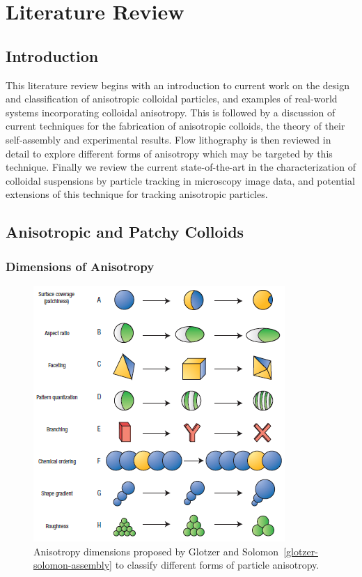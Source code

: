 \chapter{Literature Review}

\section{Introduction}

This literature review begins with an introduction to current work on the design and classification of 
anisotropic colloidal particles, and examples of real-world systems incorporating colloidal anisotropy.
This is followed by a discussion of current techniques for the fabrication of anisotropic colloids,
the theory of their self-assembly and experimental results.  Flow lithography is then reviewed in detail
to explore different forms of anisotropy which may be targeted by this technique.  Finally we review the current
state-of-the-art in the characterization of colloidal suspensions by particle tracking in microscopy image data, and
potential extensions of this technique for tracking anisotropic particles.

\section{Anisotropic and Patchy Colloids}

\subsection{Dimensions of Anisotropy}

\begin{figure}[h]
\begin{center}
\includegraphics{figures/glotzer-anisotropy-dimensions.png}
\end{center}
\caption{Anisotropy dimensions proposed by Glotzer and Solomon~\ref{glotzer-solomon-assembly} to classify 
different forms of particle anisotropy.}
\label{fig:glotzer-dimensions}
\end{figure}

